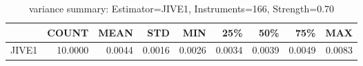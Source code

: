 \begin{table}[ht]
\centering
\caption{variance summary: Estimator=JIVE1, Instruments=166, Strength=0.70}
\begin{tabular}{lrrrrrrrr}
\toprule
 & COUNT & MEAN & STD & MIN & 25\% & 50\% & 75\% & MAX \\
\midrule
JIVE1 & 10.0000 & 0.0044 & 0.0016 & 0.0026 & 0.0034 & 0.0039 & 0.0049 & 0.0083 \\
\bottomrule
\end{tabular}
\end{table}
